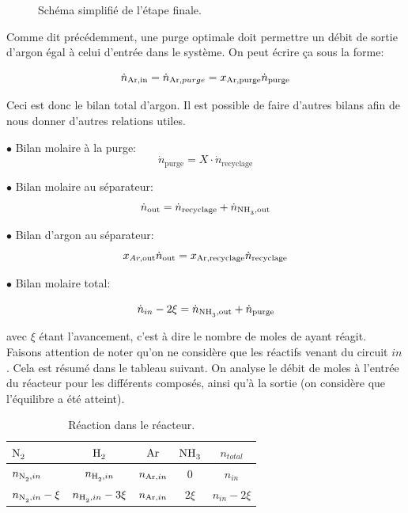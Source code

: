 \begin{figure}[h!]
	\begin{center}
		
	\end{center}
	\caption{Schéma simplifié de l'étape finale.}
	\label{fig:flow_synthese}
\end{figure}

Comme dit précédemment, une purge optimale doit permettre un débit 
de sortie d'argon égal à celui d'entrée dans le système. 
On peut écrire ça sous la forme:

\begin{equation}
\dot{n}_{\ce{Ar},\text{in}}=\dot{n}_{\ce{Ar},purge}=x_{\ce{Ar},\text{purge}} \dot{n}_{\text{purge}}
\end{equation}

Ceci est donc le bilan total d'argon. 
Il est possible de faire d'autres bilans afin de nous donner d'autres relations utiles.

$\bullet$ Bilan molaire à la purge:
\begin{equation}
\dot{n}_{\text{purge}} = X \cdot \dot{n}_{\text{recyclage}}
\label{eq:bilan_mol_purge}
\end{equation}

$\bullet$ Bilan molaire au séparateur:
\begin{equation}
\dot{n}_{\text{out}}=\dot{n}_{\text{recyclage}}+\dot{n}_{\ce{NH3},\text{out}}
\label{eq:bilan_mol_sep}
\end{equation}

$\bullet$ Bilan d'argon au séparateur:
\begin{equation}
x_{Ar,\text{out}} \dot{n}_{\text{out}}=x_{\ce{Ar},\text{recyclage}} \dot{n}_{\text{recyclage}}
\end{equation}

$\bullet$ Bilan molaire total:

\begin{equation}
	\dot{n}_{in} - 2\xi=\dot{n}_{\ce{NH3},\text{out}} + \dot{n}_{\text{purge}}
	\label{eq:bilan_mol_tot}
\end{equation}

avec $\xi$ étant l'avancement, c'est à dire le nombre de moles de  ayant réagit. 
Faisons attention de noter qu'on ne considère que les réactifs venant du circuit $in$. 
Cela est résumé dans le tableau suivant. 
On analyse le débit de moles à l'entrée du réacteur pour les différents composés, 
ainsi qu'à la sortie (on considère que l'équilibre a été atteint).

\begin{table}[h!]
	\centering
	\begin{tabular}{l|c|c|c|c}
		$\ce{N2}$ & $\ce{H2}$ & $\ce{Ar}$ & $\ce{NH3}$ & $n_{total}$ \\
		\hline
		$n_{\ce{N2},in}$ & $n_{\ce{H2},in}$ & $n_{\ce{Ar},in}$ & $0$  & $n_{in}$\\
		$n_{\ce{N2},in}-\xi$ & $n_{\ce{H2},in}-3\xi$ & $n_{\ce{Ar},in}$ & $2\xi$  & $n_{in}-2\xi$\\
	\end{tabular}
	\caption{Réaction dans le réacteur.}
	\label{tab:reaction1_primaire}
\end{table}

